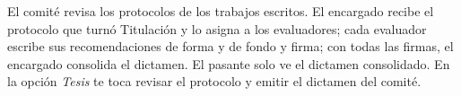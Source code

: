 \documentclass[11pt,a4paper]{article}
\begin{document}
{\small\tableofcontents}
\newpage
\begin{quevasahacer}
El comité revisa los protocolos de los trabajos escritos. El encargado recibe el protocolo que turnó Titulación y lo asigna a los evaluadores; cada evaluador escribe sus recomendaciones de forma y de fondo y firma; con todas las firmas, el encargado consolida el dictamen. El pasante solo ve el dictamen consolidado. En la opción \emph{Tesis} te toca revisar el protocolo y emitir el dictamen del comité.
\end{quevasahacer}



\end{document}
